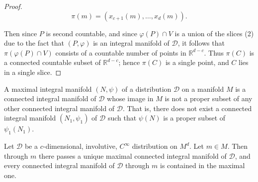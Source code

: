 \begin{proof}
	\begin{equation}
		\tag{4}\label{eq:1.62:4}
		\pi(m)=\left(x_{c+1}(m),\ldots,x_{d}(m)\right).
	\end{equation}

	Then since $P$ is second countable, and since $\varphi(P) \cap V$ is a union of the slices (2) due to the fact that $(P,\varphi)$ is an integral manifold of $\mathcal{D}$, it follows that $\pi(\varphi(P) \cap V)$ consists of a countable number of points in $\mathbb{R}^{d-c}$. Thus $\pi(C)$ is a connected countable subset of $\mathbb{R}^{d-c}$; hence $\pi(C)$ is a single point, and $C$ lies in a single slice.

\end{proof}

\begin{definition}\label{thm:1.63}
	A maximal integral manifold $(N,\psi)$ of a distribution $\mathcal{D}$ on a manifold $M$ is a connected integral manifold of $\mathcal{D}$ whose image in $M$ is not a proper subset of any other connected integral manifold of $\mathcal{D}$. That is, there does not exist a connected integral manifold $(N_1,\psi_1)$ of $\mathcal{D}$ such that $\psi(N)$ is a proper subset of $\psi_1(N_1)$. 

\end{definition}

\begin{theorem}\label{thm:1.64}
	Let $\mathcal{D}$ be a $c$-dimensional, involutive, $C^{\infty}$ distribution on $M^{d}$. Let $m \in M$. Then through $m$ there passes a unique maximal connected integral manifold of $\mathcal{D}$, and every connected integral manifold of $\mathcal{D}$ through $m$ is contained in the maximal one.

\end{theorem}

